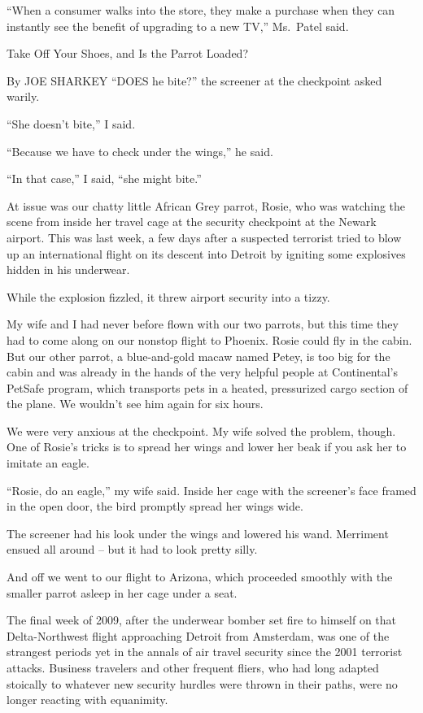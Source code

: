﻿\documentclass[12pt]{article}
\begin{document}
``When a consumer walks into the store, they make a purchase when they can instantly see the benefit
of upgrading to a new TV,'' Ms.~Patel said.

Take Off Your Shoes, and Is the Parrot Loaded?

By JOE SHARKEY ``DOES he bite?'' the screener at the checkpoint asked warily.

``She doesn't bite,'' I said.

``Because we have to check under the wings,'' he said.

``In that case,'' I said, ``she might bite.''

At issue was our chatty little African Grey parrot, Rosie, who was watching the scene from inside
her travel cage at the security checkpoint at the Newark airport. This was last week, a few days
after a suspected terrorist tried to blow up an international flight on its descent into Detroit by
igniting some explosives hidden in his underwear.

While the explosion fizzled, it threw airport security into a tizzy.

My wife and I had never before flown with our two parrots, but this time they had to come along on
our nonstop flight to Phoenix. Rosie could fly in the cabin. But our other parrot, a blue-and-gold
macaw named Petey, is too big for the cabin and was already in the hands of the very helpful people
at Continental's PetSafe program, which transports pets in a heated, pressurized cargo section of
the plane. We wouldn't see him again for six hours.

We were very anxious at the checkpoint. My wife solved the problem, though. One of Rosie's tricks is
to spread her wings and lower her beak if you ask her to imitate an eagle.

``Rosie, do an eagle,'' my wife said. Inside her cage with the screener's face framed in the open
door, the bird promptly spread her wings wide.

The screener had his look under the wings and lowered his wand. Merriment ensued all around -- but
it had to look pretty silly.

And off we went to our flight to Arizona, which proceeded smoothly with the smaller parrot asleep in
her cage under a seat.

The final week of 2009, after the underwear bomber set fire to himself on that Delta-Northwest
flight approaching Detroit from Amsterdam, was one of the strangest periods yet in the annals of air
travel security since the 2001 terrorist attacks. Business travelers and other frequent fliers, who
had long adapted stoically to whatever new security hurdles were thrown in their paths, were no
longer reacting with equanimity.
\end{document}

